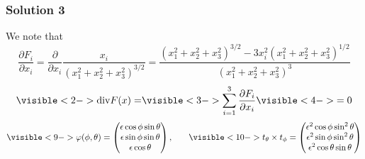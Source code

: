 \documentclass[10pt, t, allowdisplaybreaks]{beamer}
\begin{document}
\begin{frame}
    \frametitle{Solution 3}
    \par We note that
    \begin{equation*}
        \frac{\partial F_i}{\partial x_i} = \frac{\partial }{\partial x_i}\frac{x_i}{(x_1^2+x_2^2+x_3^2)^{3/2}} = \frac{(x_1^2+x_2^2+x_3^2)^{3/2} - 3x_i^2(x_1^2+x_2^2+x_3^2)^{1/2}}{(x_1^2+x_2^2+x_3^2)^{3}}
    \end{equation*}
    \begin{equation*}
        \visible<2->{
            \text{div}F(x) =
        }
        \visible<3->{
        \sum^3_{i = 1}\frac{\partial F_i}{\partial x_i}
        }
        \visible<4->{
            =0
        }
    \end{equation*}
    \begin{equation*}
        \visible<9->{
            \varphi(\phi, \theta) = \begin{pmatrix}
                \epsilon \cos \phi \sin \theta \\
                \epsilon \sin\phi \sin\theta   \\
                \epsilon\cos\theta
            \end{pmatrix},
        }
        \qquad
        \visible<10->{
            t_\theta\times t_\phi = \begin{pmatrix}
                \epsilon^2\cos\phi\sin^2\theta \\
                \epsilon^2\sin\phi\sin^2\theta \\
                \epsilon^2\cos\theta\sin\theta
            \end{pmatrix}
        }
    \end{equation*}
\end{frame}
\end{document}
